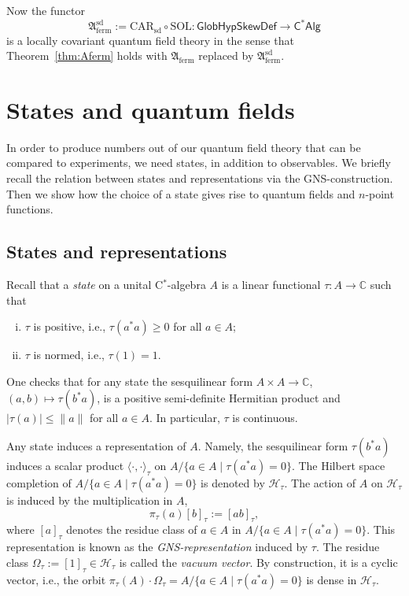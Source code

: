 \documentclass[a4paper,11pt]{amsart}
\theoremstyle{definition}
\begin{document}
Now the functor 
$$
{\mathfrak{A}_\mathrm{ferm}^\mathrm{sd}} := {\mathrm{CAR}}_\mathrm{sd} \circ {\mathrm{SOL}} : {\mathsf{GlobHypSkewDef}} \longrightarrow {\mathsf{C^*Alg}}
$$
is a locally covariant quantum field theory in the sense that Theorem~\ref{thm:Aferm} holds with ${\mathfrak{A}_\mathrm{ferm}}$ replaced by ${\mathfrak{A}_\mathrm{ferm}^\mathrm{sd}}$.

\section{States and quantum fields}

In order to produce numbers out of our quantum field theory that can be compared to experiments, we need states, in addition to observables.
We briefly recall the relation between states and representations via the GNS-construction.
Then we show how the choice of a state gives rise to quantum fields and $n$-point functions.

\subsection{States and representations}
Recall that a \emph{state} on a unital {\mbox{C$^*$}}-algebra $A$ is a linear functional $\tau: A\to {\mathbb{C}}$ such that 
\begin{enumerate}[(i)]
\item
$\tau$ is positive, i.e., $\tau(a^*a)\ge 0$ for all $a\in A$;
\item 
$\tau$ is normed, i.e., $\tau(1)=1$.
\end{enumerate}
One checks that for any state the sesquilinear form $A\times A \to {\mathbb{C}}$, $(a,b) \mapsto \tau(b^*a)$, is a positive semi-definite Hermitian product and $|\tau(a)|\leq \|a\|$ for all $a\in A$.
In particular, $\tau$ is continuous.

Any state induces a representation of $A$.
Namely, the sesquilinear form $\tau(b^*a)$ induces a scalar product ${{\langle}{\cdot},{\cdot}{\rangle}_\tau}$ on $A/\{a\in A\mid \tau(a^*a)=0\}$.
The Hilbert space completion of $A/\{a\in A\mid \tau(a^*a)=0\}$ is denoted by ${\mathcal{H}}_\tau$.
The action of $A$ on ${\mathcal{H}}_\tau$ is induced by the multiplication in $A$,
$$
\pi_\tau(a)[b]_\tau := [ab]_\tau,
$$
where $[a]_\tau$ denotes the residue class of $a\in A$ in $A/\{a\in A\mid \tau(a^*a)=0\}$.
This representation is known as the \emph{GNS-representation} induced by $\tau$.
The residue class $\Omega_\tau:=[1]_\tau\in {\mathcal{H}}_\tau$ is called the \emph{vacuum vector}.
By construction, it is a cyclic vector, i.e., the orbit $\pi_\tau(A)\cdot\Omega_\tau = A/\{a\in A\mid \tau(a^*a)=0\}$ is dense in ${\mathcal{H}}_\tau$.
\end{document}
